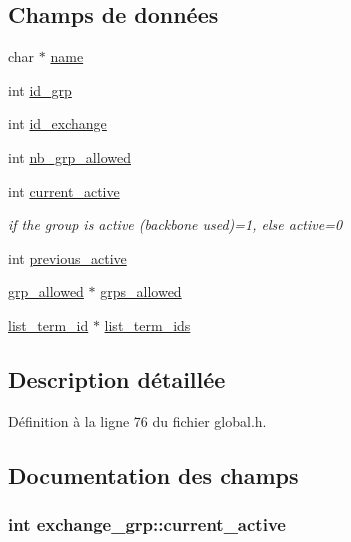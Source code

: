 \subsection*{Champs de données}
\begin{DoxyCompactItemize}
\item 
char $\ast$ \hyperlink{structexchange__grp_a3155a188779bf7782502eb4fcb994852}{name}
\item 
int \hyperlink{structexchange__grp_a2ae0b34a2185599d4cc1715f786a5609}{id\+\_\+grp}
\item 
int \hyperlink{structexchange__grp_ab0bdc5b169d2a90cae8755fe217e9c14}{id\+\_\+exchange}
\item 
int \hyperlink{structexchange__grp_af4c233bea11eb951a4b606ca434b553d}{nb\+\_\+grp\+\_\+allowed}
\item 
int \hyperlink{structexchange__grp_adb5f0b550ea9bdb627b8f7f2ae4e4e01}{current\+\_\+active}
\begin{DoxyCompactList}\small\item\em if the group is active (backbone used)=1, else active=0 \end{DoxyCompactList}\item 
int \hyperlink{structexchange__grp_a3493a6f5ca916f85526f87575e6d1c86}{previous\+\_\+active}
\item 
\hyperlink{structgrp__allowed}{grp\+\_\+allowed} $\ast$ \hyperlink{structexchange__grp_af300e925b5c53ddf77449dfcf6b69b1f}{grps\+\_\+allowed}
\item 
\hyperlink{structlist__term__id}{list\+\_\+term\+\_\+id} $\ast$ \hyperlink{structexchange__grp_a67c91f8058e419de5d63942855a20527}{list\+\_\+term\+\_\+ids}
\end{DoxyCompactItemize}


\subsection{Description détaillée}


Définition à la ligne 76 du fichier global.\+h.



\subsection{Documentation des champs}
\hypertarget{structexchange__grp_adb5f0b550ea9bdb627b8f7f2ae4e4e01}{
\subsubsection[{current\+\_\+active}]{\setlength{\rightskip}{0pt plus 5cm}int exchange\+\_\+grp\+::current\+\_\+active}}\label{structexchange__grp_adb5f0b550ea9bdb627b8f7f2ae4e4e01}


